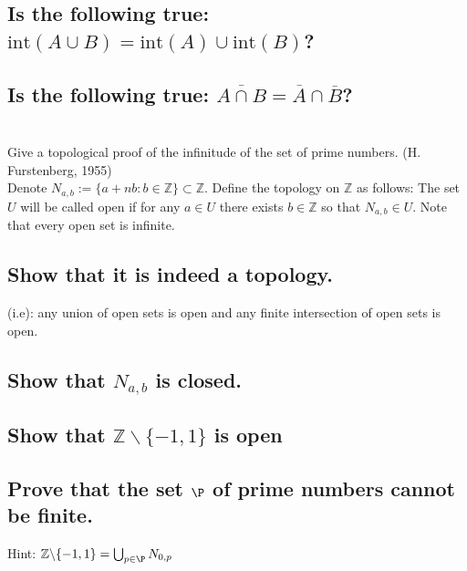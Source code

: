 \documentclass[]{article}
\newcommand{\Z}{\mathbb{Z}}
\begin{document}
\subsection{Is the following true:
$\text{int}(A\cup B) = \text{int}(A) \cup \text{int}(B)$?}





\subsection{Is the following true:
$\overline{A\cap B} = \overline{A} \cap \overline{B}$?}






















\newpage
\section{}
Give a topological proof of the infinitude of the set of prime numbers. (H. Furstenberg, 1955)\\
Denote $N_{a,b} := \{a + nb : b \in \Z\} \subset \Z$. Define the topology on $\Z$ as follows: 
The set $U$ will be called open if for any $a \in U$ there exists $b \in \Z$ so that 
$N_{a,b} \in U$. Note that every open set is infinite.

\subsection{Show that it is indeed a topology.}
(i.e): any union of open sets is open and any finite intersection of open sets is open.



\subsection{Show that $N_{a,b}$ is closed.}



\subsection{Show that $\Z \backslash \{-1,1\}$ is open}




\subsection{Prove that the set $\P$ of prime numbers cannot be finite.}
Hint: $\Z \backslash \{-1,1\} = \bigcup_{p \in \P} N_{0,p}$
\end{document}
